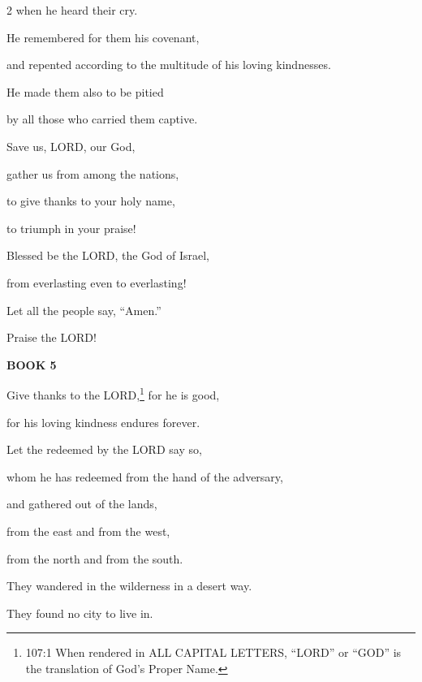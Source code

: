 \begin{multicols}{2}
	when he heard their cry.
	
	
	\myverse{}He remembered for them his covenant,
	
	and repented according to the multitude of his loving kindnesses.
	
	
	\myverse{}He made them also to be pitied
	
	by all those who carried them captive.
	
	\vspace{\baselineskip}
	
	\myverse{}Save us, LORD, our God,
	
	gather us from among the nations,
	
	to give thanks to your holy name,
	
	to triumph in your praise!
	
	\vspace{\baselineskip}
	
	\myverse{}Blessed be the LORD, the God of Israel,
	
	from everlasting even to everlasting!
	
	Let all the people say, “Amen.”
	
	Praise the LORD!
	
	
	\vspace{\baselineskip}
	\begin{center}
		{\LARGE\textbf{BOOK 5}}
	\end{center}
	\vspace{-\baselineskip}
	
	\mychapter{} \myverse*{}Give thanks to the LORD,\footnote{107:1 When rendered in ALL CAPITAL LETTERS, “LORD” or “GOD” is the translation of God’s Proper Name.}
	for he is good,
	
	\quad\quad\quad for his loving kindness endures forever.
	
	
	\myverse{}Let the redeemed by the LORD say so,
	
	whom he has redeemed from the hand of the adversary,
	
	
	\myverse{}and gathered out of the lands,
	
	from the east and from the west,
	
	from the north and from the south.
	
	\vspace{\baselineskip}
	
	\myverse{}They wandered in the wilderness in a desert way.
	
	They found no city to live in.
	

\end{multicols}
